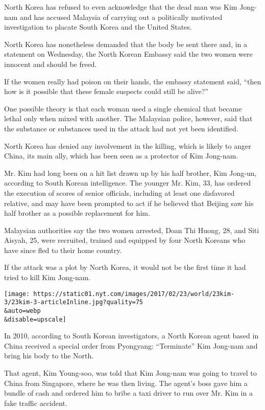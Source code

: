 North Korea has refused to even acknowledge that the dead man was Kim
Jong-nam and has accused Malaysia of carrying out a politically
motivated investigation to placate South Korea and the United States.

North Korea has nonetheless demanded that the body be sent there and, in
a statement on Wednesday, the North Korean Embassy said the two women
were innocent and should be freed.

If the women really had poison on their hands, the embassy statement
said, ``then how is it possible that these female suspects could still
be alive?''

One possible theory is that each woman used a single chemical that
became lethal only when mixed with another. The Malaysian police,
however, said that the substance or substances used in the attack had
not yet been identified.

North Korea has denied any involvement in the killing, which is likely
to anger China, its main ally, which has been seen as a protector of Kim
Jong-nam.

Mr. Kim had long been on a hit list drawn up by his half brother, Kim
Jong-un, according to South Korean intelligence. The younger Mr. Kim,
33, has ordered the execution of scores of senior officials, including
at least one disfavored relative, and may have been prompted to act if
he believed that Beijing saw his half brother as a possible replacement
for him.

Malaysian authorities say the two women arrested, Doan Thi Huong, 28,
and Siti Aisyah, 25, were recruited, trained and equipped by four North
Koreans who have since fled to their home country.

If the attack was a plot by North Korea, it would not be the first time
it had tried to kill Kim Jong-nam.

\texttt{[image: https://static01.nyt.com/images/2017/02/23/world/23kim-3/23kim-3-articleInline.jpg?quality=75\\\&auto=webp\\\&disable=upscale]}

In 2010, according to South Korean investigators, a North Korean agent
based in China received a special order from Pyongyang: ``Terminate''
Kim Jong-nam and bring his body to the North.

That agent, Kim Young-soo, was told that Kim Jong-nam was going to
travel to China from Singapore, where he was then living. The agent's
boss gave him a bundle of cash and ordered him to bribe a taxi driver to
run over Mr. Kim in a fake traffic accident.

